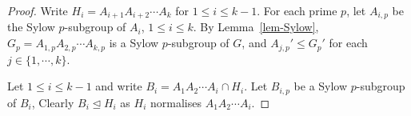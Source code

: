 \documentclass[12pt,a4paper]{article}
\newcommand\F{\mathrm{F}}
\DeclareMathOperator{\Fit}{F}
\theoremstyle{definition}
\begin{document}
\begin{proof}


Write $H_i=A_{i+1}A_{i+2} \cdots A_k$ for $1 \leq i \leq k-1$. For each prime $p$, let $A_{i,p}$  be the Sylow $p$-subgroup of $A_i$, $1 \leq i \leq k$. By Lemma~\ref{lem-Sylow},
$G_p = A_{1,p}A_{2,p} \cdots A_{k,p}$ is a Sylow $p$-subgroup of $G$, and $A_{j,p}' \leq G_p'$ for each $j \in \{1, \cdots, k\}$.

Let $1 \leq i \leq k-1$ and write $B_i=A_1A_2\cdots A_i \cap H_i$. Let $B_{i,p}$ be a Sylow $p$-subgroup of $B_i$, Clearly $B_i \unlhd H_i$ as $H_i$ normalises $A_1A_2\cdots A_i$.


\end{proof}
\end{document}

